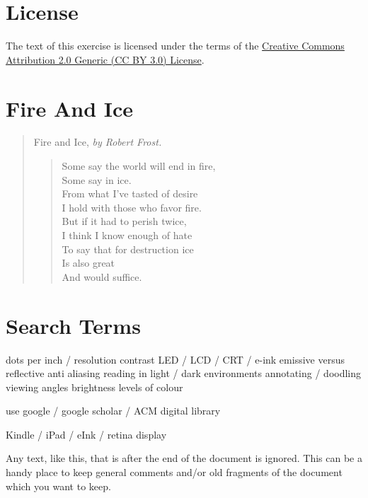 \section{License}

The text of this exercise is licensed under the terms of the \href{http://creativecommons.org/licenses/by/3.0/}{Creative Commons Attribution 2.0 Generic (CC BY 3.0) License}. 




\appendix

\section{Fire And Ice}
\label{appendix:fireandice}

\begin{quote}
Fire and Ice, \emph{by Robert Frost.}\\

\begin{verse}
Some say the world will end in fire,\\
Some say in ice.\\
From what I've tasted of desire\\
I hold with those who favor fire.\\
But if it had to perish twice,\\
I think I know enough of hate\\
To say that for destruction ice\\
Is also great\\
And would suffice.\\
\end{verse}
\end{quote}

\section{Search Terms}
\label{appendix:searchterms}

dots per inch  / resolution
contrast
LED / LCD / CRT / e-ink
emissive versus reflective
anti aliasing
reading in light / dark environments
annotating / doodling
viewing angles
brightness
levels of colour

use google / google scholar / ACM digital library



Kindle / iPad / eInk / retina display


 

Any text, like this, that is after the end of the document is ignored. This can be a
handy place to keep general comments and/or old fragments of the document
which you want to keep.
